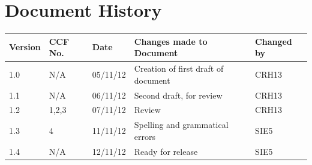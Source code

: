 \documentclass[a4paper]{article}
\begin{document}
\section{Document History}
\begin{tabular}{|l | l | l | l | l |}
\hline
Version & CCF No. & Date & Changes made to Document & Changed by \\
\hline
1.0 & N/A & 05/11/12 & Creation of first draft of document & CRH13\\
\hline
1.1 & N/A & 06/11/12 & Second draft, for review & CRH13\\
\hline
1.2 & 1,2,3 & 07/11/12 & Review & CRH13\\
\hline
1.3 & 4 & 11/11/12 & Spelling and grammatical errors & SIE5\\
\hline
1.4 & N/A & 12/11/12 & Ready for release & SIE5\\
\hline
\end{tabular}
\end{document}
